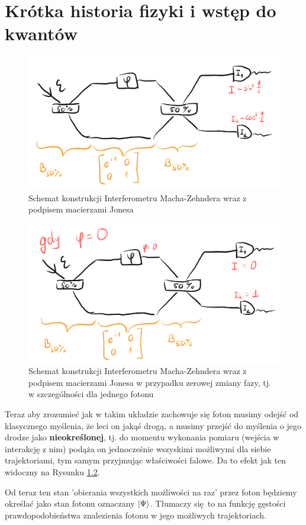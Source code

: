 \documentclass[12pt,a4paper]{report}
\newcommand{\subind}[2]{{\color{blue} #1\index{#2}}}
\renewcommand{\emph}{\textbf}
\newenvironment{lecture}[1]{\par\medskip
   \noindent\chapter{#1} \rmfamily}{\medskip}
\begin{document}
\begin{lecture}{Krótka historia fizyki i wstęp do kwantów}
    \begin{figure}[!ht]
        \centering
        \includegraphics[width=0.8\linewidth]{Wyk_1_Rys_3.jpeg}
        \caption{Schemat konstrukcji Interferometru Macha-Zehndera wraz z podpisem macierzami Jonesa}
        \label{fig:lec_1:interferometer}
    \end{figure}
    
    \begin{figure}[!ht]
        \centering
        \includegraphics[width=0.8\linewidth]{Wyk_1_Rys_4.jpeg}
        \caption{Schemat konstrukcji Interferometru Macha-Zehndera wraz z podpisem macierzami Jonesa w przypadku zerowej zmiany fazy, tj. w szczególności dla jednego fotonu}
        \label{fig:lec_1:interferometer_phi_0}
    \end{figure}
    
    Teraz aby zrozumieć jak w takim układzie zachowuje się foton musimy odejść od klasycznego myślenia, że leci on jakąś drogą, a musimy przejść do myślenia o jego drodze jako \emph{nieokreślonej}, tj. do momentu wykonania pomiaru (wejścia w interakcję z nim) podąża on jednocześnie wszyskimi możliwymi dla siebie trajektoriami, tym samym przyjmując właściwości falowe. Da to efekt jak ten widoczny na Rysunku \ref{fig:lec_1:interferometer_phi_0}.
    
    Od teraz ten stan 'obierania wszystkich możliwości na raz' przez foton będziemy określać jako \subind{stan fotonu}{Stan!fotonu} oznaczany $\ket{\Psi}$. Tłumaczy się to na funkcję gęstości prawdopodobieństwa znalezienia fotonu w jego możliwych trajektoriach.
    

\end{lecture}
\end{document}
